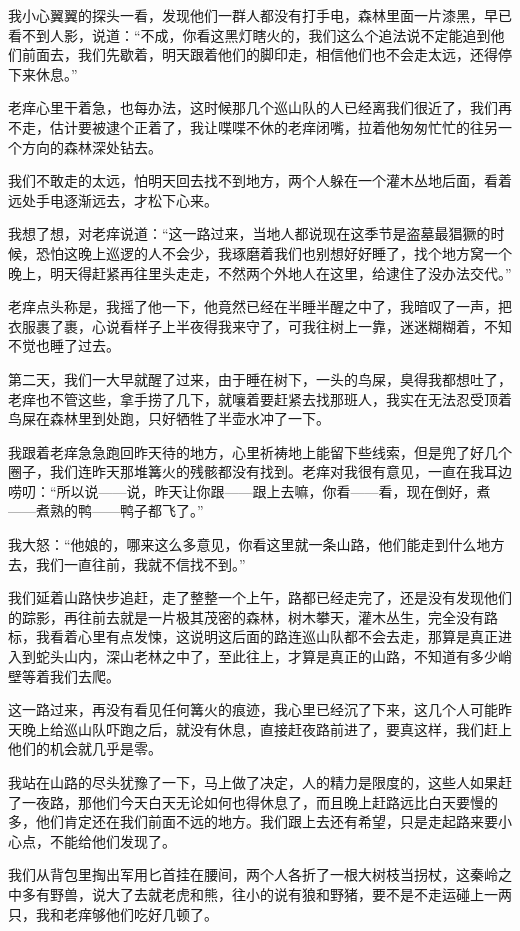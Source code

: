 我小心翼翼的探头一看，发现他们一群人都没有打手电，森林里面一片漆黑，早已看不到人影，说道：“不成，你看这黑灯瞎火的，我们这么个追法说不定能追到他们前面去，我们先歇着，明天跟着他们的脚印走，相信他们也不会走太远，还得停下来休息。”

老痒心里干着急，也每办法，这时候那几个巡山队的人已经离我们很近了，我们再不走，估计要被逮个正着了，我让喋喋不休的老痒闭嘴，拉着他匆匆忙忙的往另一个方向的森林深处钻去。

我们不敢走的太远，怕明天回去找不到地方，两个人躲在一个灌木丛地后面，看着远处手电逐渐远去，才松下心来。

我想了想，对老痒说道：“这一路过来，当地人都说现在这季节是盗墓最猖獗的时候，恐怕这晚上巡逻的人不会少，我琢磨着我们也别想好好睡了，找个地方窝一个晚上，明天得赶紧再往里头走走，不然两个外地人在这里，给逮住了没办法交代。”

老痒点头称是，我摇了他一下，他竟然已经在半睡半醒之中了，我暗叹了一声，把衣服裹了裹，心说看样子上半夜得我来守了，可我往树上一靠，迷迷糊糊着，不知不觉也睡了过去。

第二天，我们一大早就醒了过来，由于睡在树下，一头的鸟屎，臭得我都想吐了，老痒也不管这些，拿手捞了几下，就嚷着要赶紧去找那班人，我实在无法忍受顶着鸟屎在森林里到处跑，只好牺牲了半壶水冲了一下。

我跟着老痒急急跑回昨天待的地方，心里祈祷地上能留下些线索，但是兜了好几个圈子，我们连昨天那堆篝火的残骸都没有找到。老痒对我很有意见，一直在我耳边唠叨：“所以说——说，昨天让你跟——跟上去嘛，你看——看，现在倒好，煮——煮熟的鸭——鸭子都飞了。”

我大怒：“他娘的，哪来这么多意见，你看这里就一条山路，他们能走到什么地方去，我们一直往前，我就不信找不到。”

我们延着山路快步追赶，走了整整一个上午，路都已经走完了，还是没有发现他们的踪影，再往前去就是一片极其茂密的森林，树木攀天，灌木丛生，完全没有路标，我看着心里有点发悚，这说明这后面的路连巡山队都不会去走，那算是真正进入到蛇头山内，深山老林之中了，至此往上，才算是真正的山路，不知道有多少峭壁等着我们去爬。

这一路过来，再没有看见任何篝火的痕迹，我心里已经沉了下来，这几个人可能昨天晚上给巡山队吓跑之后，就没有休息，直接赶夜路前进了，要真这样，我们赶上他们的机会就几乎是零。

我站在山路的尽头犹豫了一下，马上做了决定，人的精力是限度的，这些人如果赶了一夜路，那他们今天白天无论如何也得休息了，而且晚上赶路远比白天要慢的多，他们肯定还在我们前面不远的地方。我们跟上去还有希望，只是走起路来要小心点，不能给他们发现了。

我们从背包里掏出军用匕首挂在腰间，两个人各折了一根大树枝当拐杖，这秦岭之中多有野兽，说大了去就老虎和熊，往小的说有狼和野猪，要不是不走运碰上一两只，我和老痒够他们吃好几顿了。

